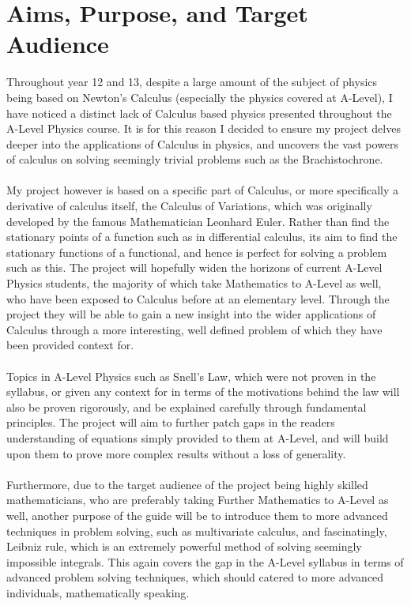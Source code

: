 \documentclass[12pt]{report}
\begin{document}
\chapter{Aims, Purpose, and Target Audience}
Throughout year 12 and 13, despite a large amount of the subject of physics being based on Newton's Calculus (especially the physics covered at A-Level), I have noticed a distinct lack of Calculus based physics presented throughout the A-Level Physics course. It is for this reason I decided to ensure my project delves deeper into the applications of Calculus in physics, and uncovers the vast powers of calculus on solving seemingly trivial problems such as the Brachistochrone.
\\
\\
My project however is based on a specific part of Calculus, or more specifically a derivative of calculus itself, the Calculus of Variations, which was originally developed by the famous Mathematician Leonhard Euler. Rather than find the stationary points of a function such as in differential calculus, its aim to find the stationary functions of a functional, and hence is perfect for solving a problem such as this. The project will hopefully widen the horizons of current A-Level Physics students, the majority of which take Mathematics to A-Level as well, who have been exposed to Calculus before at an elementary level. Through the project they will be able to gain a new insight into the wider applications of Calculus through a more interesting, well defined problem of which they have been provided context for.
\\
\\
Topics in A-Level Physics such as Snell's Law, which were not proven in the syllabus, or given any context for in terms of the motivations behind the law will also be proven rigorously, and be explained carefully through fundamental principles. The project will aim to further patch gaps in the readers understanding of equations simply provided to them at A-Level, and will build upon them to prove more complex results without a loss of generality.
\\
\\
Furthermore, due to the target audience of the project being highly skilled mathematicians, who are preferably taking Further Mathematics to A-Level as well, another purpose of the guide will be to introduce them to more advanced techniques in problem solving, such as multivariate calculus, and fascinatingly, Leibniz rule, which is an extremely powerful method of solving seemingly impossible integrals. This again covers the gap in the A-Level syllabus in terms of advanced problem solving techniques, which should catered to more advanced individuals, mathematically speaking.
\end{document}
